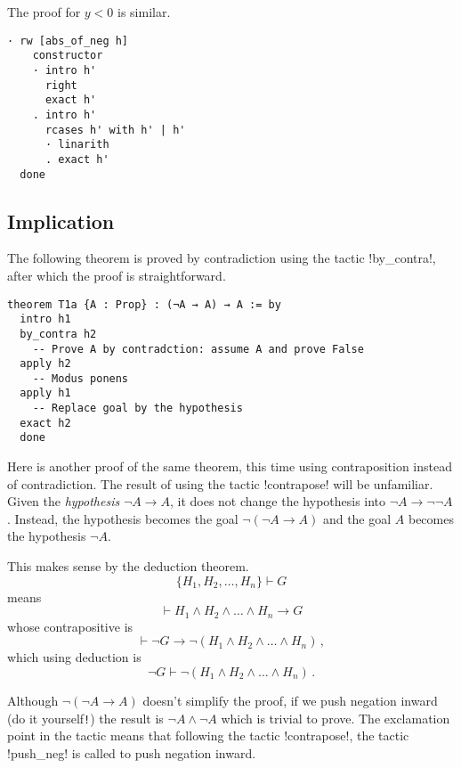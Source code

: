 

The proof for $y< 0$ is similar.
\begin{Verbatim}[firstnumber=last]
  · rw [abs_of_neg h]
    constructor
    · intro h'
      right
      exact h'
    . intro h'
      rcases h' with h' | h'
      · linarith
      . exact h'
  done
\end{Verbatim}

\subsection{Implication}

The following theorem is proved by contradiction using the tactic !by_contra!, after which the proof is straightforward.
\begin{Verbatim}
theorem T1a {A : Prop} : (¬A → A) → A := by
  intro h1
  by_contra h2
    -- Prove A by contradction: assume A and prove False
  apply h2
    -- Modus ponens
  apply h1
    -- Replace goal by the hypothesis
  exact h2
  done
\end{Verbatim}


Here is another proof of the same theorem, this time using contraposition instead of contradiction. The result of using the tactic !contrapose! will be unfamiliar. Given the \emph{hypothesis} $\neg A \rightarrow A$, it does not change the hypothesis into $\neg A \rightarrow \neg\neg A$. Instead, the hypothesis becomes the goal $\neg(\neg A \rightarrow A)$ and the goal $A$ becomes the hypothesis $\neg A$.

This makes sense by the deduction theorem.
\[
\{H_1, H_2, \ldots, H_n\} \vdash G 
\]
means 
\[
\vdash H_1\wedge H_2 \wedge \ldots \wedge H_n \rightarrow G
\]
whose contrapositive is
\[
\vdash \neg G \rightarrow \neg (H_1\wedge H_2 \wedge \ldots \wedge H_n)\,,
\]
which using deduction is
\[
\neg G \vdash \neg (H_1\wedge H_2 \wedge \ldots \wedge H_n)\,.
\]

Although $\neg(\neg A \rightarrow A)$ doesn't simplify the proof, if we push negation inward (do it yourself\verb+!+) the result is $\neg A \wedge \neg A$ which is trivial to prove. The exclamation point in the tactic means that following the tactic !contrapose!, the tactic !push_neg! is called to push negation inward.

